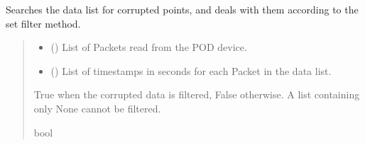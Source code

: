 \documentclass[letterpaper,10pt,english]{sphinxmanual}
\begin{document}
\begin{fulllineitems}
\begin{fulllineitems}
\label{\detokenize{PodApi.Stream:PodApi.Stream.DataHose.Hose._Filter}}
\pysigstartsignatures
{}
\pysigstopsignatures
\sphinxAtStartPar
Searches the data list for corrupted points, and deals with them         according to the set filter method.
\begin{quote}\begin{description}
\begin{itemize}
\item {} 
\sphinxAtStartPar
{} (\sphinxstyleliteralemphasis{\sphinxupquote{{[}}}{\hyperref[\detokenize{PodApi.Packets:PodApi.Packets.Packet.Packet}]{\sphinxcrossref{\sphinxstyleliteralemphasis{\sphinxupquote{Packet}}}}}\sphinxstyleliteralemphasis{\sphinxupquote{ | }}\sphinxstyleliteralemphasis{\sphinxupquote{{]}}}) \textendash{} List of Packets read from the POD device.

\item {} 
\sphinxAtStartPar
{} (\sphinxstyleliteralemphasis{\sphinxupquote{{[}}}\sphinxstyleliteralemphasis{\sphinxupquote{{]}}}) \textendash{} List of timestamps in seconds for each Packet                 in the data list.

\end{itemize}

\sphinxAtStartPar
True when the corrupted data is filtered, False otherwise. A list                 containing only None cannot be filtered.

\sphinxAtStartPar
bool

\end{description}\end{quote}


\end{fulllineitems}
\end{fulllineitems}
\end{document}

